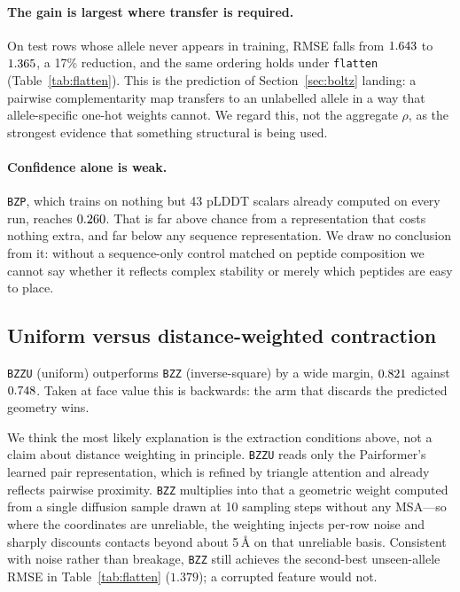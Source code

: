 \documentclass[11pt,a4paper]{article}
\newcommand{\armbzz}{\texttt{BZZ}}
\newcommand{\armbzzu}{\texttt{BZZU}}
\newcommand{\armbzp}{\texttt{BZP}}
\begin{document}
\paragraph{The gain is largest where transfer is required.} On test rows whose
allele never appears in training, RMSE falls from $1.643{}$ to
$1.365{}$, a 17\% reduction, and the same ordering holds under
\texttt{flatten} (Table~\ref{tab:flatten}). This is the prediction of
Section~\ref{sec:boltz} landing: a pairwise complementarity map transfers to an
unlabelled allele in a way that allele-specific one-hot weights cannot. We
regard this, not the aggregate $\rho$, as the strongest evidence that something
structural is being used.

\paragraph{Confidence alone is weak.} \armbzp{}, which trains on nothing but 43
pLDDT scalars already computed on every run, reaches $0.260{}$. That is far
above chance from a representation that costs nothing extra, and far below any
sequence representation. We draw no conclusion from it: without a sequence-only
control matched on peptide composition we cannot say whether it reflects
complex stability or merely which peptides are easy to place.

\subsection{Uniform versus distance-weighted contraction}

\armbzzu{} (uniform) outperforms \armbzz{} (inverse-square) by a wide margin,
$0.821{}$ against $0.748{}$. Taken at face value this is backwards: the arm
that discards the predicted geometry wins.

We think the most likely explanation is the extraction conditions above, not a
claim about distance weighting in principle. \armbzzu{} reads only the
Pairformer's learned pair representation, which is refined by triangle attention
and already reflects pairwise proximity. \armbzz{} multiplies into that a
geometric weight computed from a single diffusion sample drawn at 10 sampling
steps without any MSA---so where the coordinates are unreliable, the weighting
injects per-row noise and sharply discounts contacts beyond about 5\,\AA{} on
that unreliable basis. Consistent with noise rather than breakage, \armbzz{}
still achieves the second-best unseen-allele RMSE in Table~\ref{tab:flatten}
($1.379$); a corrupted feature would not.
\end{document}
